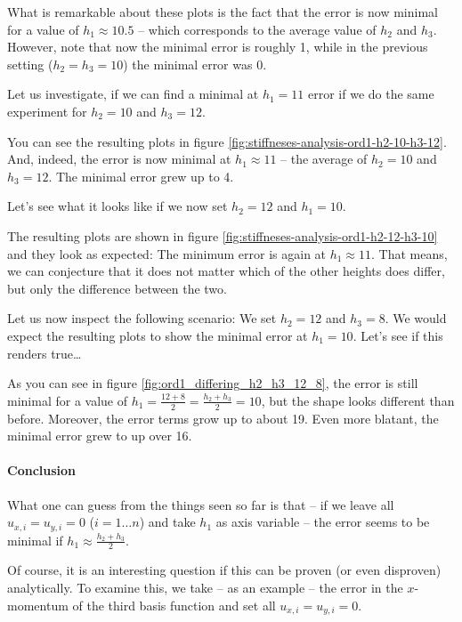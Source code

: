 \documentclass{article}
\begin{document}
What is remarkable about these plots is the fact that the error is now minimal for a value of $h_1\approx 10.5$ -- which corresponds to the average value of $h_2$ and $h_3$. However, note that now the minimal error is roughly 1, while in the previous setting ($h_2=h_3=10$) the minimal error was 0.

Let us investigate, if we can find a minimal at $h_1=11$ error if we do the same experiment for $h_2=10$ and $h_3=12$.



You can see the resulting plots in figure \ref{fig:stiffneses-analysis-ord1-h2-10-h3-12}. And, indeed, the error is now minimal at $h_1\approx 11$ -- the average of $h_2=10$ and $h_3=12$. The minimal error grew up to 4.

Let's see what it looks like if we now set $h_2=12$ and $h_1=10$.



The resulting plots are shown in figure \ref{fig:stiffneses-analysis-ord1-h2-12-h3-10} and they look as expected: The minimum error is again at $h_1\approx 11$. That means, we can conjecture that it does not matter which of the other heights does differ, but only the difference between the two.

Let us now inspect the following scenario: We set $h_2=12$ and $h_3=8$. We would expect the resulting plots to show the minimal error at $h_1=10$. Let's see if this renders true\dots



As you can see in figure \ref{fig:ord1_differing_h2_h3_12_8}, the error is still minimal for a value of $h_1=\frac{12+8}{2}=\frac{h_2+h_3}{2}=10$, but the shape looks different than before. Moreover, the error terms grow up to about 19. Even more blatant, the minimal error grew to up over 16.

\paragraph{Conclusion}

What one can guess from the things seen so far is that -- if we leave all $u_{x,i}=u_{y,i}=0$ ($i=1\dots n$) and take $h_1$ as axis variable -- the error seems to be minimal if $h_1\approx \frac{h_2+h_3}{2}$.

Of course, it is an interesting question if this can be proven (or even disproven) analytically. To examine this, we take -- as an example -- the error in the $x$-momentum of the third basis function and set all $u_{x,i}=u_{y,i}=0$. 
\end{document}
